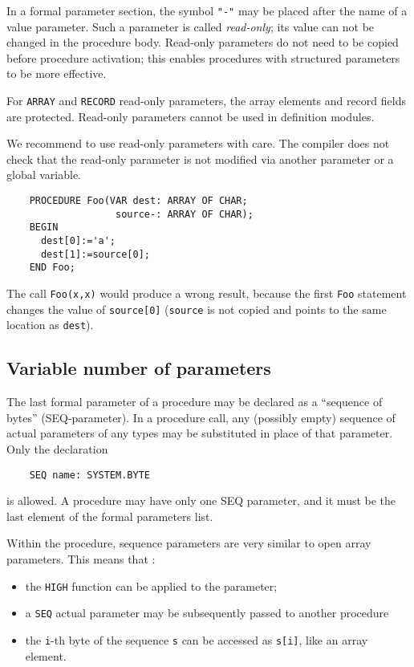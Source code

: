 \mextonly

In a formal parameter section, the symbol \verb|"-"| may be
placed after the name of a value parameter.  Such a parameter is
called {\em read-only}; its value can not be changed in the
procedure body. Read-only parameters do not need to be copied before
procedure activation; this enables procedures
with structured parameters to be more effective.

For \verb'ARRAY' and \verb'RECORD' read-only parameters,
the array elements and record fields are protected.
Read-only parameters cannot be used in definition modules.

We recommend to use read-only parameters with care. The compiler
does not check that the read-only parameter is not modified via
another parameter or a global variable.

\Example
\begin{verbatim}
    PROCEDURE Foo(VAR dest: ARRAY OF CHAR;
                   source-: ARRAY OF CHAR);
    BEGIN
      dest[0]:='a';
      dest[1]:=source[0];
    END Foo;
\end{verbatim}

The call \verb|Foo(x,x)| would produce a wrong result, because
the first \verb'Foo' statement changes the value of \verb|source[0]|
(\verb|source| is not copied and points to the same location
as \verb|dest|).

\subsection{Variable number of parameters}\label{m2:SEQ:param}

\mextonly

The last formal parameter of a procedure may be declared as a
``sequence of bytes'' (SEQ-parameter). In a procedure call, any
(possibly empty) sequence of actual parameters of any types
may be substituted in place of that parameter.
Only the declaration

\verb'    SEQ name: SYSTEM.BYTE'

is allowed. A procedure may have only one SEQ parameter, and it must be
the last element of the formal parameters list.

Within the procedure, sequence parameters are very similar to open
array parameters. This means that :
\begin{itemize}
\item the {\tt HIGH} function can be applied to the parameter;
\item a {\tt SEQ} actual parameter may be subsequently passed to another procedure
\item the \verb|i|-th byte of the sequence \verb|s|
      can be accessed as \verb|s[i]|, like an array element.
\end{itemize}

